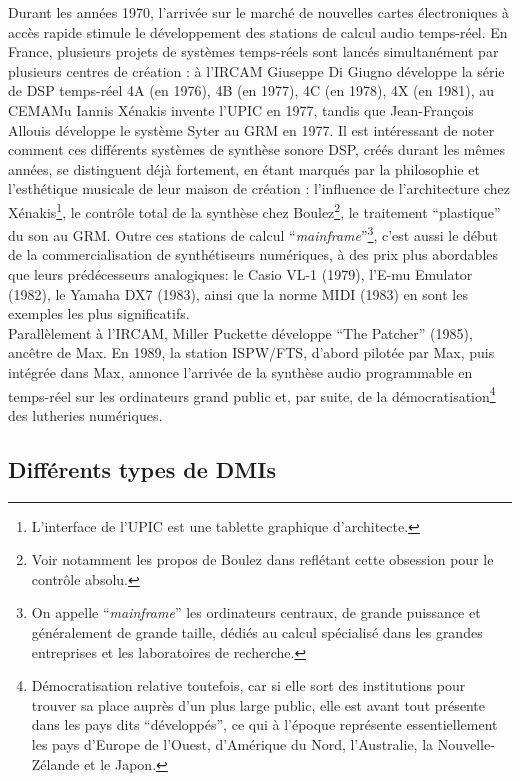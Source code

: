 \indent Durant les années 1970, l'arrivée sur le marché de nouvelles cartes électroniques à accès rapide stimule le développement des stations de calcul audio temps-réel. En France, plusieurs projets de systèmes temps-réels sont lancés simultanément par plusieurs centres de création : à l'\gls{IRCAM} Giuseppe Di Giugno développe la série de \gls{DSP} temps-réel 4A (en 1976), 4B (en 1977), 4C (en 1978), 4X (en 1981), au \gls{CEMAMu} Iannis Xénakis invente l'\gls{UPIC} en 1977, tandis que Jean-François Allouis développe le système Syter \cite{teruggi_technology_2007} au \gls{GRM} en 1977. Il est intéressant de noter comment ces différents systèmes de synthèse sonore \gls{DSP}, créés durant les mêmes années, se distinguent déjà fortement, en étant marqués par la philosophie et l'esthétique musicale de leur maison de création : l'influence de l'architecture chez Xénakis\footnote{L'interface de l'\gls{UPIC} est une tablette graphique d'architecte.}, le contrôle total de la synthèse chez Boulez\footnote{Voir notamment les propos de Boulez dans \cite{albera_pli_2017} reflétant cette obsession pour le contrôle absolu.}, le traitement ``plastique'' du son au \gls{GRM}. Outre ces stations de calcul ``\textit{mainframe}''\footnote{On appelle ``\textit{mainframe}'' les ordinateurs centraux, de grande puissance et généralement de grande taille, dédiés au calcul spécialisé dans les grandes entreprises et les laboratoires de recherche.}, c'est aussi le début de la commercialisation de synthétiseurs numériques, à des prix plus abordables que leurs prédécesseurs analogiques: le Casio VL-1 (1979), l'E-mu Emulator (1982), le Yamaha DX7 (1983), ainsi que la norme \gls{MIDI} (1983) en sont les exemples les plus significatifs.\\
\indent Parallèlement à l'\gls{IRCAM}, Miller Puckette développe ``The Patcher'' (1985), ancêtre de Max. En 1989, la station \gls{ISPW}/\gls{FTS}, d'abord pilotée par Max, puis intégrée dans Max, annonce l'arrivée de la synthèse audio programmable en temps-réel sur les ordinateurs grand public et, par suite, de la démocratisation\footnote{Démocratisation relative toutefois, car si elle sort des institutions pour trouver sa place auprès d'un plus large public, elle est avant tout présente dans les pays dits ``développés'', ce qui à l'époque représente essentiellement les pays d'Europe de l'Ouest, d'Amérique du Nord, l'Australie, la Nouvelle-Zélande et le Japon.} des lutheries numériques.


\subsection{Différents types de DMIs}

